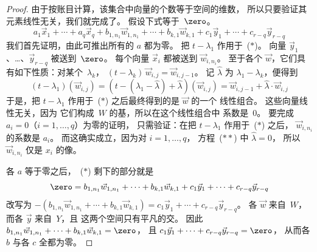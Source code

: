\begin{proof}
由于按账目计算，该集合中向量的个数等于空间的维数，
所以只要验证其元素线性无关，我们就完成了。
假设下式等于~$\zero$。
\begin{equation*}
  a_1\vec{x}_1+\cdots+a_q\vec{x}_q
    +b_{1,n_1}\vec{w}_{1,n_1}+\cdots+b_{k,1}\vec{w}_{k,1}
    +c_1\vec{y}_1+\cdots+c_{r-q}\vec{y}_{r-q}
  \tag{$*$}
\end{equation*}
我们首先证明，由此可推出所有的 $a$ 都为零。
把 $t-\lambda_1$ 作用于~($*$)。
向量 $\vec{y}_1$、\ldots、$\vec{y}_{r-q}$
被送到~$\zero$。
每个向量 $\vec{x}_i$ 都被送到
$\vec{w}_{i,n_i}$。
至于各个 $\vec{w}$，它们具有如下性质：对某个~$\lambda_k$，
$(t-\lambda_k)\,\vec{w}_{i,j}=\vec{w}_{i,j-1}$。
记 $\hat{\lambda}$ 为 $\lambda_1-\lambda_k$，便得到
\begin{equation*}
  (t-\lambda_1)(\vec{w}_{i,j})
    =(t-(\lambda_1-\hat{\lambda})+\hat{\lambda})(\vec{w}_{i,j})
    =\vec{w}_{i,j-1}+\hat{\lambda}\cdot\vec{w}_{i,j}
  \tag{$**$}
\end{equation*}
于是，把 $t-\lambda_1$ 作用于~($*$) 之后最终得到的是 $\vec{w}$ 的一个
线性组合。
这些向量线性无关，因为
它们构成~$W$ 的基，所以在这个线性组合中
系数是~$0$。
要完成 $a_i=0$（$i=1,\ldots,q$）为零的证明，
只需验证：在把 $t-\lambda_1$ 作用于~($*$) 之后，
$\vec{w}_{i,n_i}$ 的系数是 $a_i$。
而这确实成立，因为对 $i=1,\ldots,q$，
方程~($**$) 中 $\hat{\lambda}=0$，
所以 $\vec{w}_{i,n_i}$ 仅是 $x_{i}$ 的像。

各 $a$ 等于零之后，~($*$) 剩下的部分就是
\begin{equation*}
  \zero
  =
    b_{1,n_1}\vec{w}_{1,n_1}+\cdots+b_{k,1}\vec{w}_{k,1}
    +c_1\vec{y}_1+\cdots+c_{r-q}\vec{y}_{r-q}
\end{equation*}
改写为 $-(b_{1,n_1}\vec{w}_{1,n_1}+\cdots+b_{k,1}\vec{w}_{k,1})=
    c_1\vec{y}_1+\cdots+c_{r-q}\vec{y}_{r-q}$。
各 $\vec{w}$ 来自~$W$，而各 $\vec{y}$ 来自~$Y$，且
这两个空间只有平凡的交。
因此 $b_{1,n_1}\vec{w}_{1,n_1}+\cdots+b_{k,1}\vec{w}_{k,1}=\zero$，
且 $c_1\vec{y}_1+\cdots+c_{r-q}\vec{y}_{r-q}=\zero$，
从而各 $b$ 与各 $c$ 全都为零。
\end{proof}





